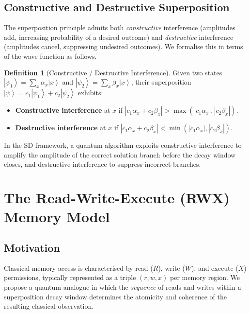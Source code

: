 \documentclass[12pt, a4paper]{article}
\theoremstyle{plain}
\theoremstyle{definition}
\newtheorem{definition}[theorem]{Definition}
\theoremstyle{remark}
\newcommand{\ket}[1]{\left| #1 \right\rangle}
\newcommand{\SD}{\ensuremath{\mathrm{SD}}}   %
\begin{document}
\subsection{Constructive and Destructive Superposition}

The superposition principle admits both \emph{constructive} interference
(amplitudes add, increasing probability of a desired outcome) and
\emph{destructive} interference (amplitudes cancel, suppressing undesired
outcomes).  We formalise this in terms of the wave function as follows.

\begin{definition}[Constructive / Destructive Interference]
  Given two states $\ket{\psi_1} = \sum_x \alpha_x \ket{x}$ and
  $\ket{\psi_2} = \sum_x \beta_x \ket{x}$, their superposition
  $\ket{\psi} = c_1 \ket{\psi_1} + c_2 \ket{\psi_2}$ exhibits:
  \begin{itemize}
    \item \textbf{Constructive interference} at $x$ if
          $|c_1 \alpha_x + c_2 \beta_x| > \max(|c_1 \alpha_x|, |c_2 \beta_x|)$.
    \item \textbf{Destructive interference} at $x$ if
          $|c_1 \alpha_x + c_2 \beta_x| < \min(|c_1 \alpha_x|, |c_2 \beta_x|)$.
  \end{itemize}
\end{definition}

In the \SD{} framework, a quantum algorithm exploits constructive interference
to amplify the amplitude of the correct solution branch before the decay
window closes, and destructive interference to suppress incorrect branches.

\section{The Read-Write-Execute (RWX) Memory Model}
\label{sec:rwx}

\subsection{Motivation}

Classical memory access is characterised by read ($R$), write ($W$), and
execute ($X$) permissions, typically represented as a triple $(r, w, x)$ per
memory region.  We propose a quantum analogue in which the \emph{sequence} of
reads and writes within a superposition decay window determines the atomicity
and coherence of the resulting classical observation.
\end{document}

